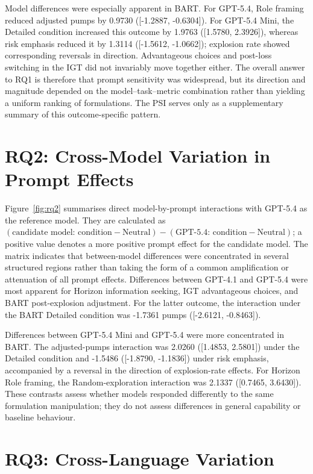 \documentclass[logo,msc]{infthesis}
\begin{document}
Model differences were especially apparent in BART. For GPT-5.4, Role framing reduced adjusted pumps by 0.9730 ([-1.2887, -0.6304]). For GPT-5.4 Mini, the Detailed condition increased this outcome by 1.9763 ([1.5780, 2.3926]), whereas risk emphasis reduced it by 1.3114 ([-1.5612, -1.0662]); explosion rate showed corresponding reversals in direction. Advantageous choices and post-loss switching in the IGT did not invariably move together either. The overall answer to RQ1 is therefore that prompt sensitivity was widespread, but its direction and magnitude depended on the model--task--metric combination rather than yielding a uniform ranking of formulations. The PSI serves only as a supplementary summary of this outcome-specific pattern.

\section{RQ2: Cross-Model Variation in Prompt Effects}

Figure~\ref{fig:rq2} summarises direct model-by-prompt interactions with GPT-5.4 as the reference model. They are calculated as \((\text{candidate model: condition}-\text{Neutral})-(\text{GPT-5.4: condition}-\text{Neutral})\); a positive value denotes a more positive prompt effect for the candidate model. The matrix indicates that between-model differences were concentrated in several structured regions rather than taking the form of a common amplification or attenuation of all prompt effects. Differences between GPT-4.1 and GPT-5.4 were most apparent for Horizon information seeking, IGT advantageous choices, and BART post-explosion adjustment. For the latter outcome, the interaction under the BART Detailed condition was -1.7361 pumps ([-2.6121, -0.8463]).

Differences between GPT-5.4 Mini and GPT-5.4 were more concentrated in BART. The adjusted-pumps interaction was 2.0260 ([1.4853, 2.5801]) under the Detailed condition and -1.5486 ([-1.8790, -1.1836]) under risk emphasis, accompanied by a reversal in the direction of explosion-rate effects. For Horizon Role framing, the Random-exploration interaction was 2.1337 ([0.7465, 3.6430]). These contrasts assess whether models responded differently to the same formulation manipulation; they do not assess differences in general capability or baseline behaviour.

\section{RQ3: Cross-Language Variation}
\end{document}
